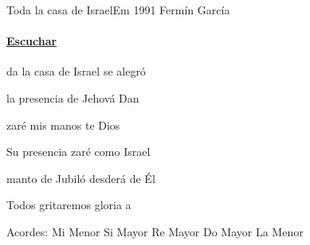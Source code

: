 \documentclass[12pt, spanish]{book}
\begin{document}
    \begin{song}{Toda la casa de Israel}{Em}
    {1991} %
    {Fermín García}
    {} %
    {}
        \ifChordBk
        \paragraph{\mbox{}\hfill\protect\href{https://open.spotify.com/intl-es/track/4BJOa0hC3laylZ4CksIUaf}{Escuchar}\mbox{}\hfill}
        \fi

        \begin{SBOpGroup}
            da la casa de Israel se alegró

             la presencia de Jehová Dan
        \end{SBOpGroup}

        \begin{SBChorus}
            zaré mis manos te Dios

             Su presencia zaré como Israel

             manto de Jubiló desderá de Él

             Todos gritaremos gloria a 
        \end{SBChorus}

        \ifChordBk
        \begin{SBOpGroup}
            Acordes:\break
            \upchord{\Em}\qquad Mi Menor \hfill
            \upchord{\B}\qquad Si Mayor \hfill\null\break
            \upchord{\D}\qquad Re Mayor \hfill
            \upchord{\C}\qquad Do Mayor \hfill\null\break
            \upchord{\Am}\qquad La Menor \hfill\null\break
        \end{SBOpGroup}
        \fi
    \end{song}
\end{document}
